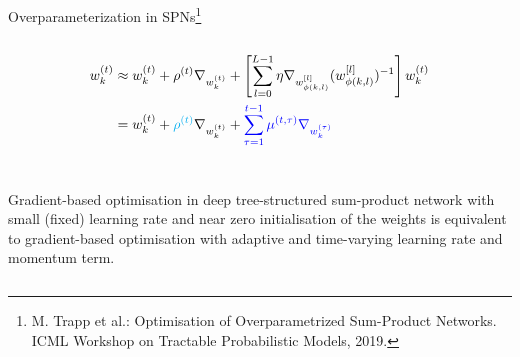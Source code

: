 \begin{frame}{Overparameterization in SPNs\footnote{\scriptsize M. Trapp et al.: Optimisation of Overparametrized Sum-Product Networks. ICML Workshop on Tractable Probabilistic Models, 2019.}}{}
\begin{columns}
\begin{column}{\linewidth}
\begin{align}
    w^{(t)}_{k} &\approx w^{(t)}_{k} + \rho^{(t)} \nabla_{w^{(t)}_{k}} + \left[ \sum_{l=0}^{L-1} \eta \nabla_{w^{[l]}_{\phi(k, l)}} (w^{[l]}_{\phi(k, l)})^{-1} \right] w^{(t)}_{k} \\
  &= w^{(t)}_{k} + {\color{cyan} \rho^{(t)}} \nabla_{w^{(t)}_{k}} + {\color{blue}\sum_{\tau=1}^{t-1} \mu^{(t,\tau)} \nabla_{w^{(\tau)}_k}}
\end{align}\\
  \begin{tcolorbox}[lower separated=false]
  \small{Gradient-based optimisation in deep tree-structured sum-product network with small (fixed) learning rate and near zero initialisation of the weights is equivalent to gradient-based optimisation with adaptive and time-varying {\color{cyan} learning rate} and {\color{blue} momentum term}.}
 \end{tcolorbox}
\end{column}
\end{columns}
\end{frame}

\iffalse
\begin{frame}{Overparameterization in SPNs \small{[Trapp 2019]}}{}
\begin{columns}
\begin{column}{\linewidth}
\texttt{[image: nltcs\_experiment]}
\end{column}
\end{columns}
\end{frame}
\fi

\iffalse
\begin{frame}{Bayesian Parameter Learning}
  \begin{itemize}
    \item The key insight for Bayesian parameter learning\footnote{\scriptsize Zhao et al.: Collapsed variational inference for sum-product networks. In ICML, 2016.}
        is that \emph{sum nodes} can be interpreted as \emph{latent variables} $Z_\SumNode$, clustering data instances.
    \item Given a vector of states for each sum, $\z$ induces a so-called induced tree ($\SPT$) on $\SPN$.
  \end{itemize}
  \begin{figure}
  \centering{
    
    }
\end{figure}
\end{frame}
\fi

